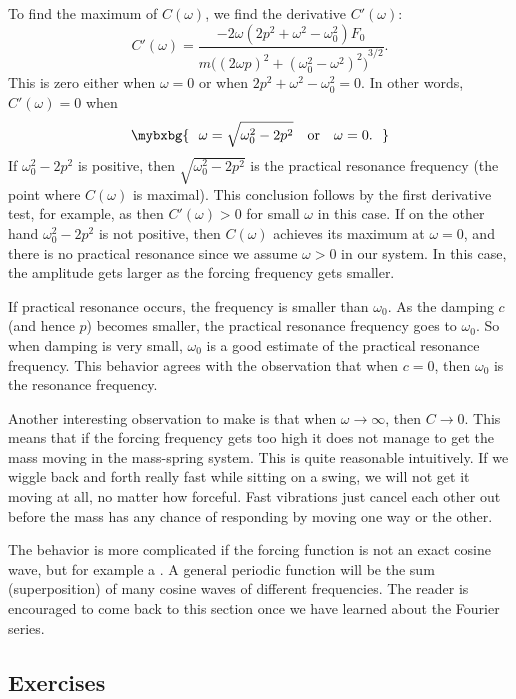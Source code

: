 To find the maximum of $C(\omega)$, we find the derivative $C'(\omega)$:
\begin{equation*}
C'(\omega) =
\frac{- 2\omega( 2p^2+\omega^2-\omega_0^2)F_0}
{m {\bigl({(2\omega p)}^2+{(\omega_0^2-\omega^2)}^2\bigr)}^{3/2}} .
\end{equation*}
This is zero either when $\omega = 0$ or when
$2p^2+\omega^2-\omega_0^2 = 0$.  In other words, $C'(\omega) = 0$ when
\begin{equation*}
\mybxbg{
~~
\omega = \sqrt{\omega_0^2 - 2p^2} \quad \text{or} \quad \omega = 0 .
~~
}
\end{equation*}
If $\omega_0^2 - 2p^2$ is positive, then
$\sqrt{\omega_0^2 - 2p^2}$ is the practical resonance frequency (the
point where $C(\omega)$ is maximal).  This conclusion follows by the first derivative
test, for example, as then $C'(\omega) > 0$ for small $\omega$ in this case.
If on the other hand $\omega_0^2 - 2p^2$ is not positive, then
$C(\omega)$ achieves its maximum at
$\omega=0$, and
there is no practical resonance since we assume $\omega > 0$
in our system.  In this case, the amplitude gets larger as the forcing
frequency gets smaller.

If practical resonance occurs, the frequency is smaller than
$\omega_0$.  As the damping $c$ (and hence $p$) becomes smaller, the
practical resonance frequency
goes to $\omega_0$.  So when damping is very
small, $\omega_0$ is a good estimate of the practical resonance frequency.  This
behavior
agrees with the observation that when $c=0$, then $\omega_0$ is the resonance
frequency.

Another interesting observation to make is that when $\omega \to \infty$,
then $C \to 0$.  This means that if the forcing frequency gets too high it
does not manage to get the mass moving in the mass-spring system.  This is
quite reasonable intuitively.
If we wiggle back and forth really fast while sitting on a swing, we will
not get it moving at all, no matter how forceful.  Fast
vibrations just cancel each other out before the mass has any chance of
responding by moving one way or the other.

The behavior is more complicated if the forcing function is not an
exact cosine wave, but for example a .
A general periodic function will be the sum (superposition) of many
cosine waves of different frequencies.
The reader is encouraged to come
back to this section once we have learned about the Fourier series.

\subsection{Exercises}

